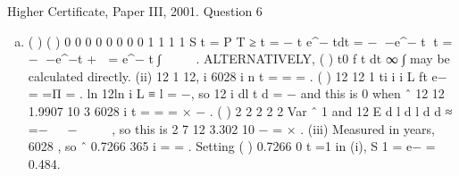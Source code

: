 \documentclass[a4paper,12pt]{article}
\begin{document}


Higher Certificate, Paper III, 2001. Question 6
\begin{enumerate}[(a)]
\item  ( ) ( ) 0 0 0 0
0 0 0 0
1 1 1 1 S t = P T ≥ t = − t \lambda e^{−\lambda} tdt = − −e^{−\lambda} t t = − −e^{−\lambda}t +  = e^{−\lambda} t ∫     .
ALTERNATIVELY, ( )
t0
f t dt ∞ ∫ may be calculated directly.
(ii)
12
1
12, i 6028
i
n t
=
= \sigma = .
( ) 12
12
1
ti
i
i
L ft e\lambda \lambda −
=
=Π = \sigma .
ln 12ln i L ≡ l = \lambda −\lambda\sigmat , so 12
i
dl t
d\lambda \lambda
= −\sigma
and this is 0 when ˆ 12 12 1.9907 10 3
6028 i t
\lambda = = = × − \sigma .
( ) 2
2 2 2
2
Var ˆ 1 and 12
E
d l
d l d
d
\lambda
\lambda \lambda
\lambda
≈ =−
 
−  
 
, so this is
2
7 12 3.302 10
\lambda − = × .
(iii) Measured in years, 6028 , so ˆ 0.7266
365 i \sigmat = \lambda = .
Setting ( ) 0.7266
0 t =1 in (i), S 1 = e− = 0.484.

\end{enumerate}
\end{document}

